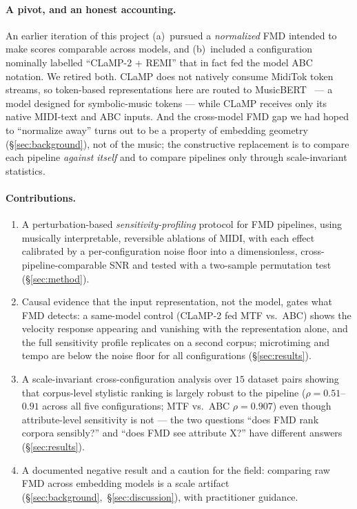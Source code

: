 \documentclass[11pt]{article}
\begin{document}
\paragraph{A pivot, and an honest accounting.}
An earlier iteration of this project (a)~pursued a \emph{normalized} FMD
intended to make scores comparable across models, and (b)~included a
configuration nominally labelled ``CLaMP-2 + REMI'' that in fact fed the
model ABC notation. We retired both. CLaMP does not natively consume
MidiTok token streams, so token-based representations here are routed to
MusicBERT~\cite{zeng2021musicbert} --- a model designed for symbolic-music
tokens --- while CLaMP receives only its native MIDI-text and ABC inputs.
And the cross-model FMD gap we had hoped to ``normalize away'' turns out to
be a property of embedding geometry (\S\ref{sec:background}), not of the
music; the constructive replacement is to compare each pipeline
\emph{against itself} and to compare pipelines only through scale-invariant
statistics.

\paragraph{Contributions.}
\begin{enumerate}\itemsep2pt
  \item A perturbation-based \emph{sensitivity-profiling} protocol for FMD
  pipelines, using musically interpretable, reversible ablations of MIDI,
  with each effect calibrated by a per-configuration noise floor into a
  dimensionless, cross-pipeline-comparable SNR and tested with a two-sample
  permutation test (\S\ref{sec:method}).
  \item Causal evidence that the input representation, not the model, gates
  what FMD detects: a same-model control (CLaMP-2 fed MTF vs.\ ABC) shows
  the velocity response appearing and vanishing with the representation
  alone, and the full sensitivity profile replicates on a second corpus;
  microtiming and tempo are below the noise floor for all configurations
  (\S\ref{sec:results}).
  \item A scale-invariant cross-configuration analysis over $15$ dataset
  pairs showing that corpus-level stylistic ranking is largely robust to
  the pipeline ($\rho=0.51$--$0.91$ across all five configurations; MTF
  vs.\ ABC $\rho=0.907$) even though attribute-level sensitivity is not ---
  the two questions ``does FMD rank corpora sensibly?'' and ``does FMD see
  attribute X?'' have different answers (\S\ref{sec:results}).
  \item A documented negative result and a caution for the field: comparing
  raw FMD across embedding models is a scale artifact
  (\S\ref{sec:background},~\S\ref{sec:discussion}), with practitioner
  guidance.
\end{enumerate}
\end{document}
